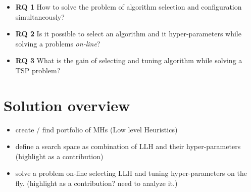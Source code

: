 \begin{itemize}
	\item \textbf{RQ 1} How to solve the problem of algorithm selection and configuration simultaneously?

	\item \textbf{RQ 2} Is it possible to select an algorithm and it hyper-parameters while solving a problems \textit{on-line}?

	\item \textbf{RQ 3} What is the gain of selecting and tuning algorithm while solving a TSP problem?
\end{itemize}


\section{Solution overview}

\begin{itemize}
	\item create / find portfolio of MHs (Low level Heuristics)
	\item define a search space as combination of LLH and their hyper-parameters (highlight as a contribution)
	\item solve a problem on-line selecting LLH and tuning hyper-parameters on the fly. (highlight as a contribution? need to analyze it.)
\end{itemize}


